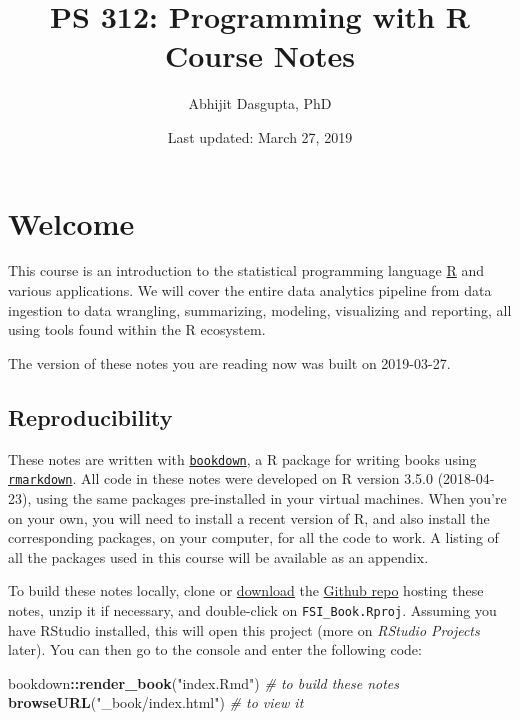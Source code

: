 \documentclass[12pt,letterpaperpaper,openany]{book}
\title{PS 312: Programming with R\\
Course Notes}
\author{Abhijit Dasgupta, PhD}
\date{Last updated: March 27, 2019}
\newenvironment{Shaded}{\begin{snugshade}}{\end{snugshade}}
\newcommand{\CommentTok}[1]{\textcolor[rgb]{0.56,0.35,0.01}{\textit{#1}}}
\newcommand{\KeywordTok}[1]{\textcolor[rgb]{0.13,0.29,0.53}{\textbf{#1}}}
\newcommand{\NormalTok}[1]{#1}
\newcommand{\OperatorTok}[1]{\textcolor[rgb]{0.81,0.36,0.00}{\textbf{#1}}}
\newcommand{\StringTok}[1]{\textcolor[rgb]{0.31,0.60,0.02}{#1}}
\begin{document}
\maketitle

\hypertarget{welcome}{%
\chapter*{Welcome}\label{welcome}}

This course is an introduction to the statistical programming language
\href{http://www.r-project.org}{R} and various applications. We will cover the entire data analytics pipeline from data ingestion to data wrangling, summarizing, modeling, visualizing and reporting, all using tools found within the R ecosystem.

The version of these notes you are reading now was built on
2019-03-27.

\hypertarget{reproducibility}{%
\section*{Reproducibility}\label{reproducibility}}

These notes are written with \href{https://bookdown.org}{\texttt{bookdown}}, a R package for writing books using \href{https://rmarkdown.rstudio.com}{\texttt{rmarkdown}}.
All code in these notes were developed on R version 3.5.0 (2018-04-23), using
the same packages pre-installed in your virtual machines. When you're on your
own, you will need to install a recent version of R, and also install the
corresponding packages, on your computer, for all the code to work. A listing of
all the packages used in this course will be available as an appendix.

To build these notes locally, clone or \href{https://github.com/araastat/FSI_Book/archive/master.zip}{download} the
\href{https://github.com/araastat/FSI_Book}{Github repo} hosting these notes, unzip it if necessary, and double-click on \texttt{FSI\_Book.Rproj}. Assuming you have RStudio installed, this will open this project (more on \emph{RStudio Projects} later). You can then go to the console and enter the following code:

\begin{Shaded}
\begin{Highlighting}[]
\NormalTok{bookdown}\OperatorTok{::}\KeywordTok{render_book}\NormalTok{(}\StringTok{"index.Rmd"}\NormalTok{) }\CommentTok{# to build these notes}
\KeywordTok{browseURL}\NormalTok{(}\StringTok{"_book/index.html"}\NormalTok{) }\CommentTok{# to view it}
\end{Highlighting}
\end{Shaded}
\end{document}
